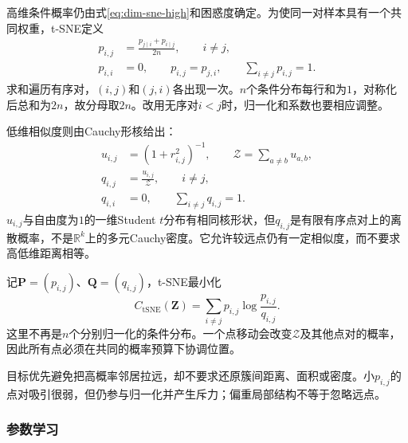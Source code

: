 高维条件概率仍由式\eqref{eq:dim-sne-high}和困惑度确定。为使同一对样本具有一个共同权重，t-SNE定义
\begin{equation}
  \label{eq:dim-tsne-joint}
  \begin{aligned}
    p_{i,j}&=\frac{p_{j\mid i}+p_{i\mid j}}{2n},\qquad i\ne j,\\
    p_{i,i}&=0,\qquad p_{i,j}=p_{j,i},\qquad
      \sum_{i\ne j}p_{i,j}=1.
  \end{aligned}
\end{equation}
求和遍历有序对，$(i,j)$和$(j,i)$各出现一次。$n$个条件分布每行和为$1$，对称化后总和为$2n$，故分母取$2n$。改用无序对$i<j$时，归一化和系数也要相应调整。

低维相似度则由Cauchy形核给出：
\begin{equation}
  \label{eq:dim-tsne-low}
  \begin{aligned}
    u_{i,j}&=(1+r_{i,j}^2)^{-1},\qquad
      \mathcal{Z}=\sum_{a\ne b}u_{a,b},\\
    q_{i,j}&=\frac{u_{i,j}}{\mathcal{Z}},\qquad i\ne j,\\
    q_{i,i}&=0,\qquad \sum_{i\ne j}q_{i,j}=1.
  \end{aligned}
\end{equation}
$u_{i,j}$与自由度为$1$的一维Student $t$分布有相同核形状，但$q_{i,j}$是有限有序点对上的离散概率，不是$\mathbb{R}^k$上的多元Cauchy密度。它允许较远点仍有一定相似度，而不要求高低维距离相等。

记$\bm{P}=(p_{i,j})$、$\bm{Q}=(q_{i,j})$，t-SNE最小化
\begin{equation}
  \label{eq:dim-tsne-loss}
  C_{\mathrm{tSNE}}(\bm{Z})
    =\sum_{i\ne j}p_{i,j}\log\frac{p_{i,j}}{q_{i,j}}.
\end{equation}
这里不再是$n$个分别归一化的条件分布。一个点移动会改变$\mathcal{Z}$及其他点对的概率，因此所有点必须在共同的概率预算下协调位置。

目标优先避免把高概率邻居拉远，却不要求还原簇间距离、面积或密度。小$p_{i,j}$的点对吸引很弱，但仍参与归一化并产生斥力；偏重局部结构不等于忽略远点。

\subsubsection{参数学习}


